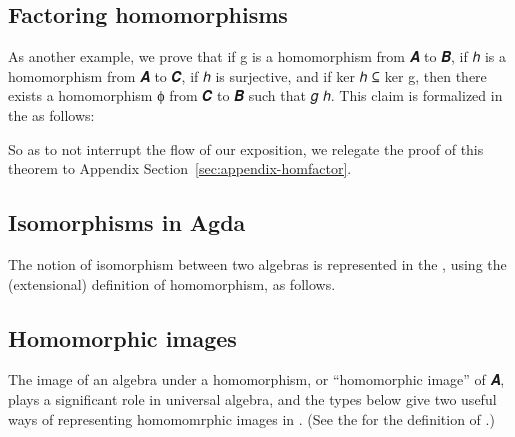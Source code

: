 \documentclass[a4paper,USenglish,cleveref,autoref,thm-restate]{lipics-v2019}
\begin{document}
\subsection{Factoring homomorphisms}
As another example, we prove that if \AB g is a homomorphism from \AB 𝑨 to \AB 𝑩, if \AB ℎ is a homomorphism from \AB 𝑨 to \AB 𝑪, if \AB ℎ is surjective, and if ker \AB ℎ ⊆ ker \AB g, then there exists a homomorphism \AB ϕ from \AB 𝑪 to \AB 𝑩 such that \AB 𝑔 \AS\AgdaSymbol{=}\AS{}\AS\AB ℎ.  This claim is formalized in the \agdaualib as follows:
\begin{code}\end{code}
So as to not interrupt the flow of our exposition, we relegate the proof of this theorem to Appendix Section~\ref{sec:appendix-homfactor}.

\subsection{Isomorphisms in Agda}\label{sec:isomorphism}
The notion of isomorphism between two algebras is represented in the \agdaualib, using the (extensional) definition of homomorphism, as follows.
\begin{code}\end{code}

\subsection{Homomorphic images}\label{sec:homomorphic-images}
The image of an algebra  under a homomorphism, or ``homomorphic image'' of \AgdaBound 𝑨, plays a significant role in universal algebra, and the types below give two useful ways of representing homomomrphic images in \agda. (See the \preludemodule for the definition of \AgdaSpace{}.)
\begin{code}\end{code}
\end{document}
